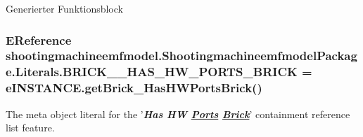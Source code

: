 Generierter Funktionsblock \hypertarget{interfaceshootingmachineemfmodel_1_1_shootingmachineemfmodel_package_1_1_literals_a30e0a585f71efea6eee6c72f3f9b02c7}{
\subsubsection[{B\-R\-I\-C\-K\-\_\-\-\_\-\-H\-A\-S\-\_\-\-H\-W\-\_\-\-P\-O\-R\-T\-S\-\_\-\-B\-R\-I\-C\-K}]{\setlength{\rightskip}{0pt plus 5cm}E\-Reference shootingmachineemfmodel.\-Shootingmachineemfmodel\-Package.\-Literals.\-B\-R\-I\-C\-K\-\_\-\-\_\-\-H\-A\-S\-\_\-\-H\-W\-\_\-\-P\-O\-R\-T\-S\-\_\-\-B\-R\-I\-C\-K = e\-I\-N\-S\-T\-A\-N\-C\-E.\-get\-Brick\-\_\-\-Has\-H\-W\-Ports\-Brick()}}\label{interfaceshootingmachineemfmodel_1_1_shootingmachineemfmodel_package_1_1_literals_a30e0a585f71efea6eee6c72f3f9b02c7}
The meta object literal for the '{\itshape {\bfseries Has H\-W \hyperlink{interfaceshootingmachineemfmodel_1_1_ports}{Ports} \hyperlink{interfaceshootingmachineemfmodel_1_1_brick}{Brick}}}' containment reference list feature.

